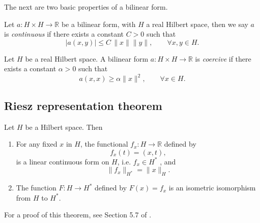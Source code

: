 The next are two basic properties of a bilinear form.

\begin{definition} Let $a:H\times H \rightarrow \mathbb{R}$ be a bilinear form, with $H$ a real Hilbert space, then we say $a$ is \emph{continuous} if there exists a constant $C>0$ such that $$|a(x,y)|\leq C\,\|x\|\|y\|,\qquad\forall x,y\in H.$$
\end{definition}
\begin{definition}
Let $H$ be a real Hilbert space. A bilinear form $a:H\times H\rightarrow \mathbb{R}$ is \emph{coercive} if there exists a constant $\alpha>0$ such that
$$a(x,x)\geq \alpha \|x\|^2,\qquad \forall x\in H.$$
\end{definition}

\subsection*{Riesz representation theorem}
\begin{theorem} Let $H$ be a Hilbert space. Then
\begin{enumerate}
\item For any fixed $x$ in $H$, the functional $f_x:H\rightarrow \mathbb{R}$ defined by $$f_x(t)=(x,t),$$ is a linear continuous form on $H$, i.e. $f_x\in H^*$ , and $$\|f_x\|_{H^*}=\|x\|_H.$$
\item The function $F:H\rightarrow H^*$ defined by $F(x)=f_x$ is an isometric isomorphism from $H$ to $H^*$.
\end{enumerate}
\end{theorem}
For a proof of this theorem, see Section 5.7 of \cite{trudinger1983}.

